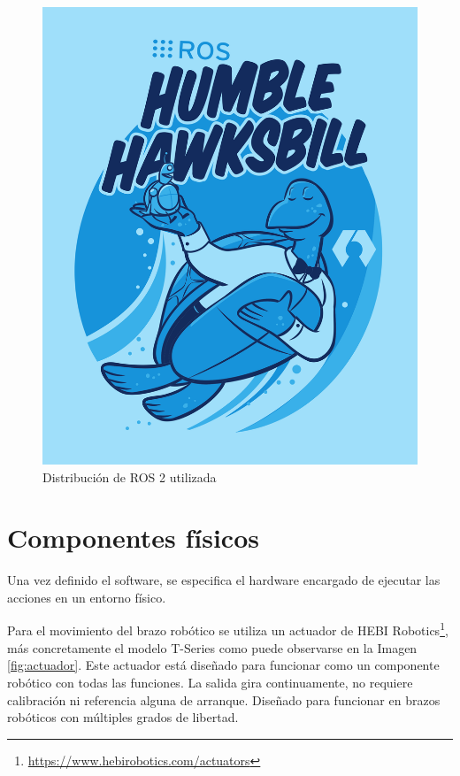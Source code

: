 \begin{figure}[ht!]
	\centering
	\begin{minipage}{0.35\linewidth}
		\centering
		\includegraphics[width=\linewidth]{figs/humble.png}
	\end{minipage}
	\caption[Distribución de ROS 2 utilizada]{Distribución de ROS 2 utilizada}
	\label{fig:rosdis}
\end{figure}

\section{Componentes físicos}
\label{sec:entornos}

Una vez definido el software, se especifica el hardware encargado de ejecutar las acciones en un entorno físico.

Para el movimiento del brazo robótico se utiliza un actuador de HEBI Robotics\footnote{\url{https://www.hebirobotics.com/actuators}}, más concretamente el modelo T-Series como puede observarse en la Imagen \ref{fig:actuador}.
Este actuador está diseñado para funcionar como un componente robótico con todas las funciones.
La salida gira continuamente, no requiere calibración ni referencia alguna de arranque.
Diseñado para funcionar en brazos robóticos con múltiples grados de libertad.


